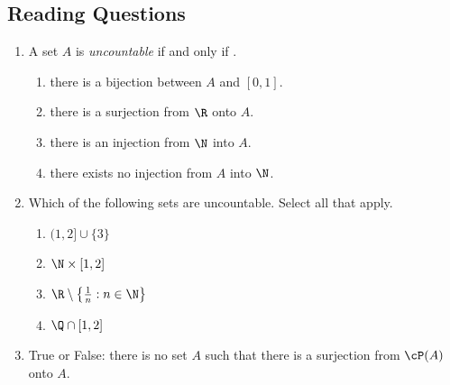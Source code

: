
  

\subsection*{Reading Questions}

\begin{enumerate}
    \item A set $A$ is \emph{uncountable} if and only if \underline{\phantom{there exists no injection $f:A\to\N$\qquad\qquad}}.
    \begin{enumerate}
        \item there is a bijection between $A$ and $[0,1]$.
        \item there is a surjection from $\R$ onto $A$.
        \item there is an injection from $\N$ into $A$.
        \item there exists no injection from $A$ into $\N$.
    \end{enumerate}

    \item Which of the following sets are uncountable. Select all that apply.
    \begin{enumerate}
        \item $(1,2]\cup\{3\}$
        \item $\N\times[1,2]$
        \item $\R\setminus\left\{\tfrac 1n:n\in\N\right\}$
        \item $\Q\cap[1,2]$
    \end{enumerate}
    
    \item True or False: there is no set $A$ such that there is a surjection from $\cP(A)$ onto $A$.
\end{enumerate}

